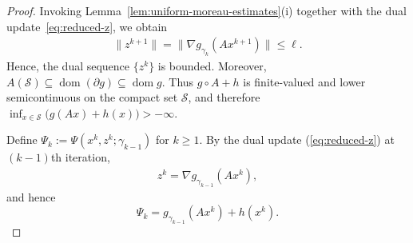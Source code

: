 \documentclass[11pt]{article}
\numberwithin{equation}{section}
\newcommand{\dist}{\operatorname{dist}}
\newcommand{\prox}{\operatorname{prox}}
\DeclareMathOperator{\dom}{dom}
\begin{document}
\begin{proof}
Invoking Lemma~\ref{lem:uniform-moreau-estimates}(i) together with the
dual update~\eqref{eq:reduced-z}, we obtain
\begin{eqnarray}\label{zkbound}
    \|z^{k+1}\|
    =\|\nabla g_{\gamma_k}(A x^{k+1})\|\le \ell.
\end{eqnarray}
Hence, the dual sequence \(\{z^k\}\) is bounded.
Moreover,
$
    A(\mathcal S)\subseteq\dom(\partial g)\subseteq\dom g.
$
Thus $g\circ A+h$ is finite-valued and lower semicontinuous on the compact
set $\mathcal S$, and therefore
$
    \inf_{x\in\mathcal S}\bigl(g(Ax)+h(x)\bigr)>-\infty.
$

Define $\Psi_k:=\Psi(x^k,z^k;\gamma_{k-1})$ for $k\ge 1$. By the dual update (\ref{eq:reduced-z}) at \((k-1)\)th iteration,
\begin{eqnarray}\label{zkop}
    z^k=\nabla g_{\gamma_{k-1}}(Ax^k),
\end{eqnarray}
and hence
\[
    \Psi_k=g_{\gamma_{k-1}}(Ax^k)+h(x^k).
\]


\end{proof}
\end{document}
